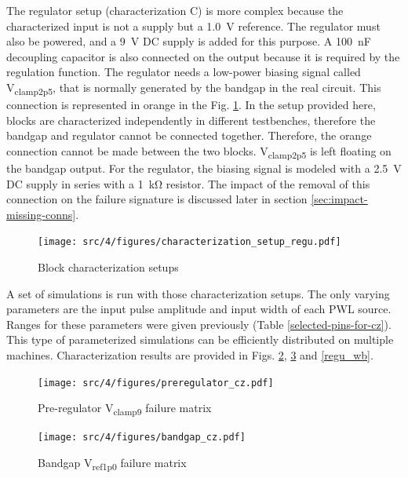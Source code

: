 %
The regulator setup (characterization C) is more complex because the characterized input is not a supply but a \SI{1.0}{\volt} reference.
The regulator must also be powered, and a \SI{9}{\volt} DC supply is added for this purpose.
A \SI{100}{\nano\farad} decoupling capacitor is also connected on the output because it is required by the regulation function.
The regulator needs a low-power biasing signal called V\textsubscript{clamp2p5}, that is normally generated by the bandgap in the real circuit.
This connection is represented in orange in the Fig. \ref{fig:block_function_cz_regu}.
In the setup provided here, blocks are characterized independently in different testbenches, therefore the bandgap and regulator cannot be connected together.
Therefore, the orange connection cannot be made between the two blocks.
V\textsubscript{clamp2p5} is left floating on the bandgap output.
For the regulator, the biasing signal is modeled with a \SI{2.5}{\volt} DC supply in series with a \SI{1}{\kilo\ohm} resistor.
The impact of the removal of this connection on the failure signature is discussed later in section \ref{sec:impact-missing-conns}.

\begin{figure}[!h]
  \centering
  \texttt{[image: src/4/figures/characterization\_setup\_regu.pdf]}
  \caption{Block characterization setups}
  \label{fig:block_function_cz_regu}
\end{figure}

A set of simulations is run with those characterization setups.
The only varying parameters are the input pulse amplitude and input width of each PWL source.
Ranges for these parameters were given previously (Table \ref{selected-pins-for-cz}).
This type of parameterized simulations can be efficiently distributed on multiple machines.
Characterization results are provided in Figs. \ref{pre_regu_wb}, \ref{bandgap_wb} and \ref{regu_wb}.

\begin{figure}[!h]
  \centering
  \texttt{[image: src/4/figures/preregulator\_cz.pdf]}
  \caption{Pre-regulator V\textsubscript{clamp9} failure matrix}
  \label{pre_regu_wb}
\end{figure}

\begin{figure}[!h]
  \centering
  \texttt{[image: src/4/figures/bandgap\_cz.pdf]}
  \caption{Bandgap V\textsubscript{ref1p0} failure matrix}
  \label{bandgap_wb}
\end{figure}

